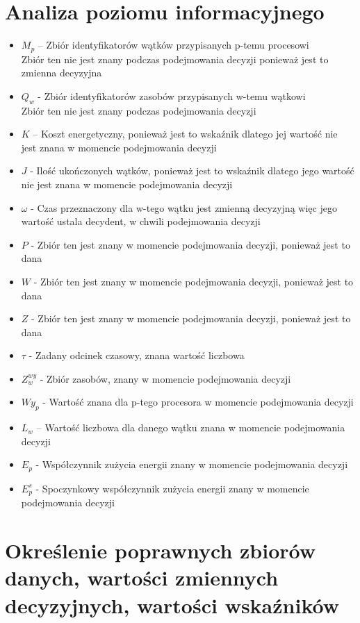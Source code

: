 \documentclass[a4paper,12pt]{extarticle}
\newcommand{\dolGora}[2]{
    _{#1}^{#2}
}
\begin{document}
\section{Analiza poziomu informacyjnego}
    \begin{itemize}
        \item	$M_{p}$ – Zbiór identyfikatorów wątków przypisanych p-temu procesowi\\ Zbiór ten nie jest znany podczas podejmowania decyzji ponieważ jest to zmienna decyzyjna
        \item   $Q_{w}$ - Zbiór identyfikatorów zasobów przypisanych w-temu wątkowi \\ Zbiór ten nie jest znany podczas podejmowania decyzji
        \item	$K$ – Koszt energetyczny, ponieważ jest to  wskaźnik dlatego jej wartość nie jest znana w momencie podejmowania decyzji
        \item   $J$ - Ilość ukończonych wątków, ponieważ jest to  wskaźnik dlatego jego wartość nie jest znana w momencie podejmowania decyzji 
        \item $\omega$ - Czas przeznaczony dla w-tego wątku jest zmienną decyzyjną więc jego wartość ustala decydent, w chwili podejmowania decyzji
        \item	$P$ -  Zbiór ten jest znany w momencie podejmowania decyzji, ponieważ jest to dana
        \item	$W$ -  Zbiór ten jest znany w momencie podejmowania decyzji, ponieważ jest to dana
        \item	$Z$ -  Zbiór ten jest znany w momencie podejmowania decyzji, ponieważ jest to dana
        \item   $\tau$ - Zadany odcinek czasowy, znana wartość liczbowa 
        \item   $Z^{wy}_w$ - Zbiór zasobów, znany w momencie podejmowania decyzji
        \item	${Wy_{p}}$ - Wartość znana dla p-tego procesora w momencie podejmowania decyzji
        \item	$L_w$ – Wartość liczbowa dla danego wątku znana w momencie podejmowania decyzji
        \item	$E_p$ - Współczynnik zużycia energii znany w momencie podejmowania decyzji
        \item   $E\dolGora{p}{s}$ - Spoczynkowy współczynnik zużycia energii znany w momencie podejmowania decyzji
    \end{itemize}

\newpage
\section{Określenie poprawnych zbiorów danych, wartości zmiennych decyzyjnych, wartości wskaźników}
\end{document}
